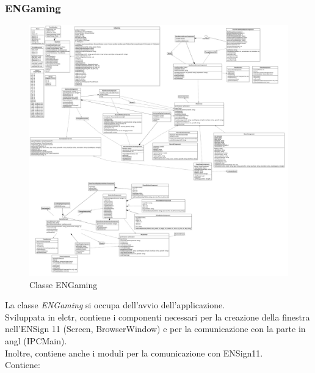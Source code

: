 \subsubsection{ENGaming}
\begin{figure}[h]
    \centering
    \includegraphics[width=340pt]{images/prog/ENGaming.png}
    \caption{Classe ENGaming}
    \label{fig:engaming}
\end{figure}
La classe \emph{ENGaming} si occupa dell'avvio dell'applicazione.\\ Sviluppata in \gls{elctr}, contiene i componenti necessari per la creazione della finestra nell'ENSign 11 (Screen, BrowserWindow) e per la comunicazione con la parte in \gls{angl} (IPCMain).\\
Inoltre, contiene anche i moduli per la comunicazione con ENSign11.\\
Contiene:
